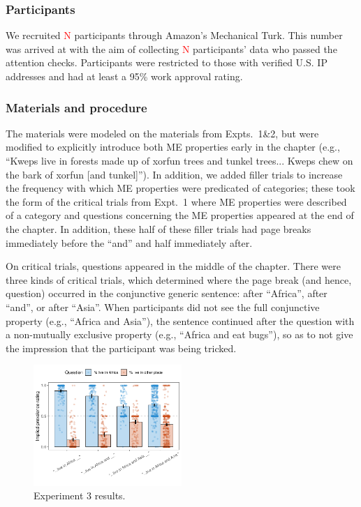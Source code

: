 \documentclass[10pt,letterpaper]{article}
\newcommand{\red}[1]{{\textcolor{Red}{#1}}}
\begin{document}
\subsubsection{Participants}

We recruited \red{N} participants through Amazon's Mechanical Turk.
This number was arrived at with the aim of collecting \red{N} participants' data who passed the attention checks.  
Participants were restricted to those with verified U.S. IP addresses and had at least a 95\% work approval rating. 

\subsubsection{Materials and procedure}

The materials were modeled on the materials from Expts.~1\&2, but were modified to explicitly introduce both ME properties early in the chapter (e.g., ``Kweps live in forests made up of xorfun trees and tunkel trees... Kweps chew on the bark of xorfun [and tunkel]'').
In addition, we added filler trials to increase the frequency with which ME properties were predicated of categories; these took the form of the critical trials from Expt.~1 where ME properties were described of a category and questions concerning the ME properties appeared at the end of the chapter. 
In addition, these half of these filler trials had page breaks immediately before the ``and'' and half immediately after.

On critical trials, questions appeared in the middle of the chapter. 
There were three kinds of critical trials, which determined where the page break (and hence, question) occurred in the conjunctive generic sentence: after ``Africa'', after ``and'', or after ``Asia''. 
When participants did not see the full conjunctive property (e.g., ``Africa and Asia''), the sentence continued after the question with a non-mutually exclusive property (e.g., ``Africa and eat bugs''), so as to not give the impression that the participant was being tricked. 

\begin{figure}[h]
  \centering
    \includegraphics[width=0.5\textwidth]{expt3_summary}
  \caption{Experiment 3 results.}
    \label{fig:expt3}
  \end{figure}
 
\end{document}
